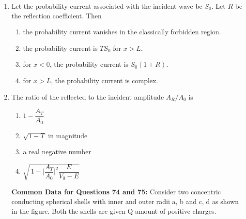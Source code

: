 \documentclass[journal,12pt,onecolumn]{IEEEtran}
\theoremstyle{remark}
\begin{document}
\begin{enumerate}
\item Let the probability current associated with the incident wave be $S_0$. Let $R$ be the reflection coefficient. Then
\hfill{}
\begin{enumerate}
    \item the probability current vanishes in the classically forbidden region.
    \item the probability current is $T S_0$ for $x>L$.
    \item for $x<0$, the probability current is $S_0(1+R)$.
    \item for $x>L$, the probability current is complex.
\end{enumerate}


\item The ratio of the reflected to the incident amplitude $A_R/A_0$ is
\hfill{}
\begin{multicols}{2}
\begin{enumerate}
    \item $1 - \dfrac{A_T}{A_0}$
    \item $\sqrt{1-T}$ in magnitude
    \item a real negative number
    \item $ \sqrt{\,1 - \biggl|\dfrac{A_T}{A_0}\biggr|^{2}\dfrac{E}{V_0 - E}}$
\end{enumerate}
\end{multicols}
\vspace{0.5mm}
\textbf{Common Data for Questions 74 and 75:} 
Consider two concentric conducting spherical shells with inner and outer radii a, b and c, d as shown in the figure. Both the shells are given Q amount of positive charges.



\end{enumerate}
\end{document}
